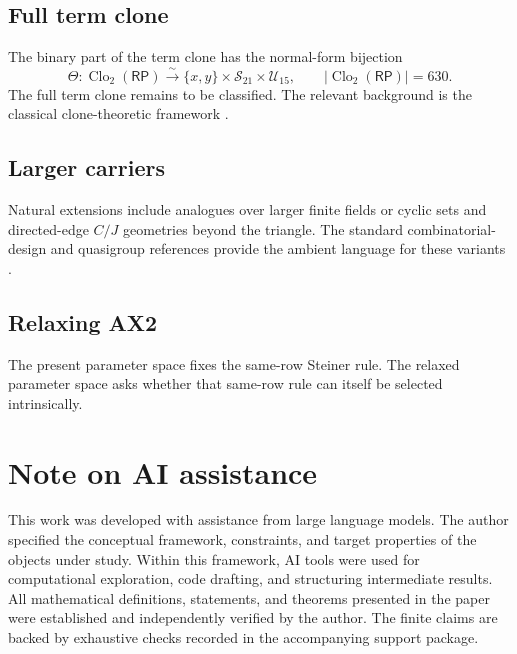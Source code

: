 \documentclass[11pt]{article}
\theoremstyle{definition}
\newcommand{\RP}{\mathsf{RP}}
\begin{document}
\subsection{Full term clone}\label{all-arity-term-algebra}

The binary part of the term clone has the normal-form bijection
\[
\Theta:\operatorname{Clo}_2(\RP)\xrightarrow{\sim}
\{x,y\}\times\mathcal S_{21}\times\mathcal U_{15},
\qquad
|\operatorname{Clo}_2(\RP)|=630.
\]
The full term clone remains to be classified.  The relevant background is the
classical clone-theoretic framework \cite{Post1941,Rosenberg1970,Szendrei1986,Lau2006}.

\subsection{Larger carriers}\label{larger-carriers}\label{larger-carriers-relaxed-ax2}

Natural extensions include analogues over larger finite fields or cyclic sets
and directed-edge \(C/J\) geometries beyond the triangle.  The standard
combinatorial-design and quasigroup references provide the ambient language for
these variants \cite{DenesKeedwell1974,ColbournDinitz2007,Pflugfelder1990}.

\subsection{Relaxing AX2}\label{relaxing-ax2}

The present parameter space fixes the same-row Steiner rule.  The relaxed parameter space
asks whether that same-row rule can itself be selected intrinsically.

\section*{Note on AI assistance}

This work was developed with assistance from large language models.  The author
specified the conceptual framework, constraints, and target properties of the
objects under study.  Within this framework, AI tools were used for
computational exploration, code drafting, and structuring intermediate results.
All mathematical definitions, statements, and theorems presented in the paper
were established and independently verified by the author.  The finite claims
are backed by exhaustive checks recorded in the accompanying support package.
\end{document}
